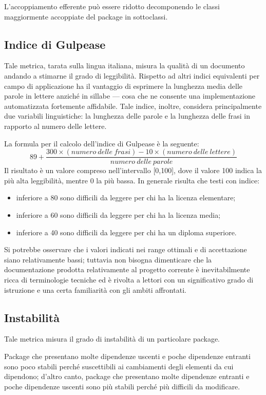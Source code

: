L'accoppiamento efferente può essere ridotto decomponendo le classi maggiormente accoppiate del package in sottoclassi.


\subsection{Indice di Gulpease}
Tale metrica, tarata sulla lingua italiana, misura la qualità di un documento andando a stimarne il grado di leggibilità. Rispetto ad altri indici equivalenti per campo di applicazione ha il vantaggio di esprimere la lunghezza media delle parole in lettere anziché in sillabe --- cosa che ne consente una implementazione automatizzata fortemente affidabile. Tale indice, inoltre, considera principalmente due variabili linguistiche: la lunghezza delle parole e la lunghezza delle frasi in rapporto al numero delle lettere.

La formula per il calcolo dell'indice di Gulpease è la seguente:
\begin{equation}
	89+\frac{300\times(numero~delle~frasi)-10\times(numero~delle~lettere)}{numero~delle~parole}
\end{equation}
Il risultato è un valore compreso nell'intervallo [0,100], dove il valore 100 indica la più alta leggibilità, mentre 0 la più bassa. In generale risulta che testi con indice:
\begin{itemize}
	\item inferiore a 80 sono difficili da leggere per chi ha la licenza elementare;
	\item inferiore a 60 sono difficili da leggere per chi ha la licenza media;
	\item inferiore a 40 sono difficili da leggere per chi ha un diploma superiore.	
\end{itemize}
Si potrebbe osservare che i valori indicati nei range ottimali e di accettazione siano relativamente bassi; tuttavia non bisogna dimenticare che la documentazione prodotta relativamente al progetto corrente è inevitabilmente ricca di terminologie tecniche ed è rivolta a lettori con un significativo grado di istruzione e una certa familiarità con gli ambiti affrontati.


\subsection{Instabilità}
Tale metrica misura il grado di instabilità di un particolare package.

Package che presentano molte dipendenze uscenti e poche dipendenze entranti sono poco stabili perché suscettibili ai cambiamenti degli elementi da cui dipendono; d'altro canto, package che presentano molte dipendenze entranti e poche dipendenze uscenti sono più stabili perché più difficili da modificare.

